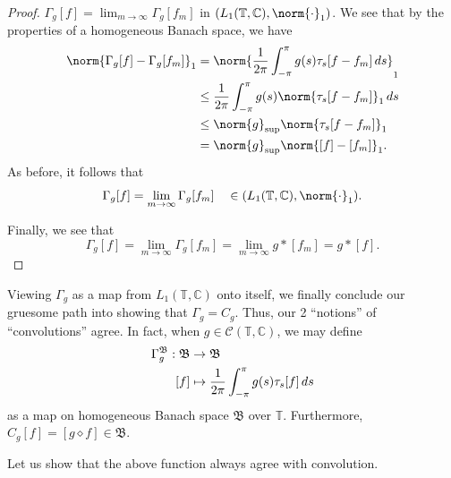 \documentclass[notoc,notitlepage]{tufte-book}
\begin{document}
\begin{proof}
  \noindent
   \WTS $\Gamma_g[f] = \lim_{m \to \infty} \Gamma_g[f_m]$
  in $(L_1(\mathbb{T}, \mathbb{C}), \norm{\cdot}_1)$.
  We see that by the properties of a homogeneous Banach space,
  we have
  \begin{align*}
    \norm{\Gamma_g[f] - \Gamma_g[f_m]}_1
    &= \norm{ \frac{1}{2\pi} \int_{-\pi}^{\pi} g(s)\tau_s[f - f_m] \dif{s} }_1 \\
    &\leq \frac{1}{2\pi} \int_{-\pi}^{\pi} g(s) \norm{\tau_s[f - f_m]}_1 \dif{s} \\
    &\leq \norm{g}_{\sup} \norm{\tau_s[f - f_m]}_1 \\
    &= \norm{g}_{\sup} \norm{[f] - [f_m]}_1.
  \end{align*}
  As before, it follows that
  \begin{equation*}
    \Gamma_g[f] = \lim_{m \to \infty} \Gamma_g[f_m] \quad
      \in (L_1(\mathbb{T}, \mathbb{C}), \norm{\cdot}_1).
  \end{equation*}

  \noindent
   Finally, we see that
  \begin{equation*}
    \Gamma_g[f] = \lim_{m \to \infty} \Gamma_g[f_m]
    = \lim_{m \to \infty} g * [f_m]
    = g * [f].
  \end{equation*}
\end{proof}

Viewing $\Gamma_g$ as a map from
$L_1(\mathbb{T}, \mathbb{C})$ onto itself,
we finally conclude our gruesome path into showing that $\Gamma_g = C_g$.
Thus, our 2 ``notions'' of ``convolutions'' agree.
In fact, when $g \in \mathcal{C}(\mathbb{T}, \mathbb{C})$,
we may define
\begin{align*}
  \Gamma_g^{\mathfrak{B}} : \mathfrak{B} &\to \mathfrak{B} \\
  [f] &\mapsto \frac{1}{2\pi} \int_{-\pi}^{\pi} g(s) \tau_s[f] \mathop{}\!d{s}
\end{align*}
as a map on  homogeneous Banach space $\mathfrak{B}$
over $\mathbb{T}$.
Furthermore, $C_g[f] = [g \diamond f] \in \mathfrak{B}$.

Let us show that the above function always agree with convolution.
\end{document}

